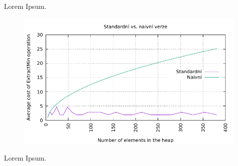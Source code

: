 \documentclass[12pt,a4paper]{report}
\begin{document}
Lorem Ipsum.

	\begin{figure}[h]	
		\centering	
		\includegraphics[scale=1]{graph_2}		
	\end{figure}

Lorem Ipsum.
\end{document}
